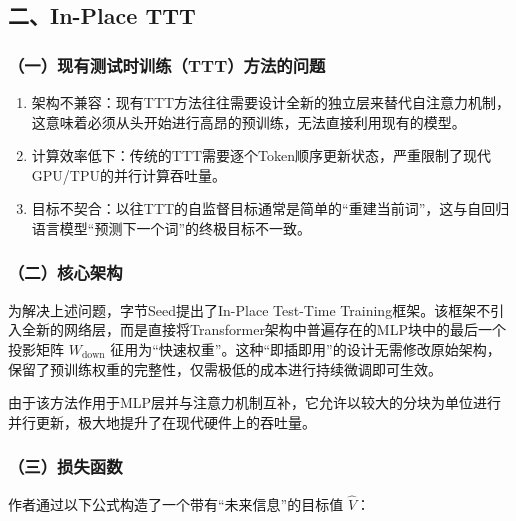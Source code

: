\hypertarget{ux4e8cin-place-ttt}{%
\subsection{二、In-Place TTT}\label{ux4e8cin-place-ttt}}

\hypertarget{ux4e00ux73b0ux6709ux6d4bux8bd5ux65f6ux8badux7ec3tttux65b9ux6cd5ux7684ux95eeux9898}{%
\subsubsection{（一）现有测试时训练（TTT）方法的问题}\label{ux4e00ux73b0ux6709ux6d4bux8bd5ux65f6ux8badux7ec3tttux65b9ux6cd5ux7684ux95eeux9898}}

\begin{enumerate}
\def\labelenumi{\arabic{enumi}.}
\item
  架构不兼容：现有TTT方法往往需要设计全新的独立层来替代自注意力机制，这意味着必须从头开始进行高昂的预训练，无法直接利用现有的模型。
\item
  计算效率低下：传统的TTT需要逐个Token顺序更新状态，严重限制了现代GPU/TPU的并行计算吞吐量。
\item
  目标不契合：以往TTT的自监督目标通常是简单的``重建当前词''，这与自回归语言模型``预测下一个词''的终极目标不一致。
\end{enumerate}

\hypertarget{ux4e8cux6838ux5fc3ux67b6ux6784-2}{%
\subsubsection{（二）核心架构}\label{ux4e8cux6838ux5fc3ux67b6ux6784-2}}

为解决上述问题，字节Seed提出了In-Place Test-Time Training框架。该框架不引入全新的网络层，而是直接将Transformer架构中普遍存在的MLP块中的最后一个投影矩阵 \(W_{\mathrm{down}}\) 征用为``快速权重''。这种``即插即用''的设计无需修改原始架构，保留了预训练权重的完整性，仅需极低的成本进行持续微调即可生效。

由于该方法作用于MLP层并与注意力机制互补，它允许以较大的分块为单位进行并行更新，极大地提升了在现代硬件上的吞吐量。

\hypertarget{ux4e09ux635fux5931ux51fdux6570}{%
\subsubsection{（三）损失函数}\label{ux4e09ux635fux5931ux51fdux6570}}

作者通过以下公式构造了一个带有``未来信息''的目标值 \(\hat V\)：

